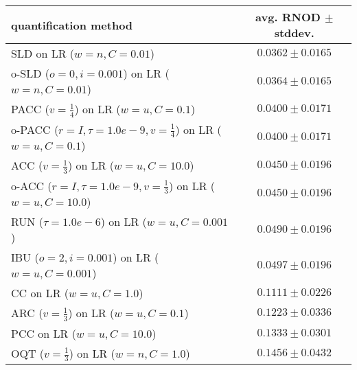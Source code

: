 \begin{tabular}{lc}
  \toprule
  quantification method & avg. RNOD $\pm$ stddev. \\
  \midrule
  SLD on LR ($w=n, C=0.01$) & $\mathbf{0.0362 \pm 0.0165}$ \\
  o-SLD ($o=0, i=0.001$) on LR ($w=n, C=0.01$) & $0.0364 \pm 0.0165$ \\
  PACC ($v=\frac{1}{4}$) on LR ($w=u, C=0.1$) & $0.0400 \pm 0.0171$ \\
  o-PACC ($r=I, \tau=1.0e-9, v=\frac{1}{4}$) on LR ($w=u, C=0.1$) & $0.0400 \pm 0.0171$ \\
  ACC ($v=\frac{1}{3}$) on LR ($w=u, C=10.0$) & $0.0450 \pm 0.0196$ \\
  o-ACC ($r=I, \tau=1.0e-9, v=\frac{1}{3}$) on LR ($w=u, C=10.0$) & $0.0450 \pm 0.0196$ \\
  RUN ($\tau=1.0e-6$) on LR ($w=u, C=0.001$) & $0.0490 \pm 0.0196$ \\
  IBU ($o=2, i=0.001$) on LR ($w=u, C=0.001$) & $0.0497 \pm 0.0196$ \\
  CC on LR ($w=u, C=1.0$) & $0.1111 \pm 0.0226$ \\
  ARC ($v=\frac{1}{3}$) on LR ($w=u, C=0.1$) & $0.1223 \pm 0.0336$ \\
  PCC on LR ($w=u, C=10.0$) & $0.1333 \pm 0.0301$ \\
  OQT ($v=\frac{1}{3}$) on LR ($w=n, C=1.0$) & $0.1456 \pm 0.0432$ \\
  \bottomrule
\end{tabular}
